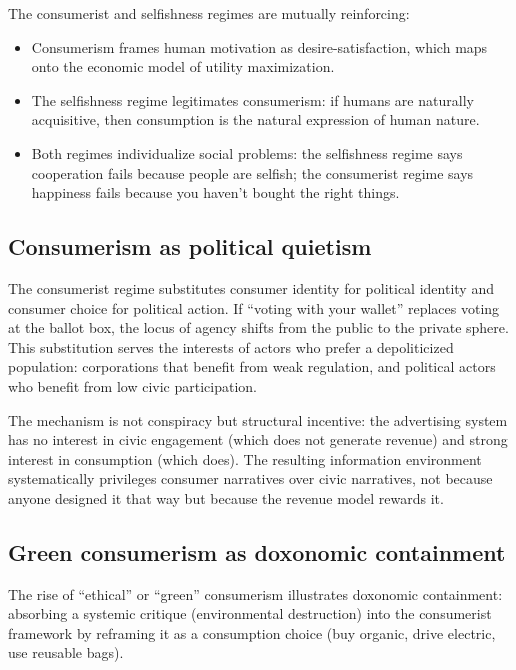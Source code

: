 The consumerist and selfishness regimes are mutually reinforcing:
\begin{itemize}[nosep]
  \item Consumerism frames human motivation as desire-satisfaction, which maps onto the economic model of utility maximization.
  \item The selfishness regime legitimates consumerism: if humans are naturally acquisitive, then consumption is the natural expression of human nature.
  \item Both regimes individualize social problems: the selfishness regime says cooperation fails because people are selfish; the consumerist regime says happiness fails because you haven't bought the right things.
\end{itemize}

\subsection{Consumerism as political quietism}

\begin{remark}
\label{prop:depoliticization}
The consumerist regime substitutes consumer identity for political identity and consumer choice for political action.
If ``voting with your wallet'' replaces voting at the ballot box, the locus of agency shifts from the public to the private sphere.
This substitution serves the interests of actors who prefer a depoliticized population: corporations that benefit from weak regulation, and political actors who benefit from low civic participation.
\end{remark}

The mechanism is not conspiracy but structural incentive: the advertising system has no interest in civic engagement (which does not generate revenue) and strong interest in consumption (which does).
The resulting information environment systematically privileges consumer narratives over civic narratives, not because anyone designed it that way but because the revenue model rewards it.

\subsection{Green consumerism as doxonomic containment}

The rise of ``ethical'' or ``green'' consumerism illustrates doxonomic containment: absorbing a systemic critique (environmental destruction) into the consumerist framework by reframing it as a consumption choice (buy organic, drive electric, use reusable bags).

